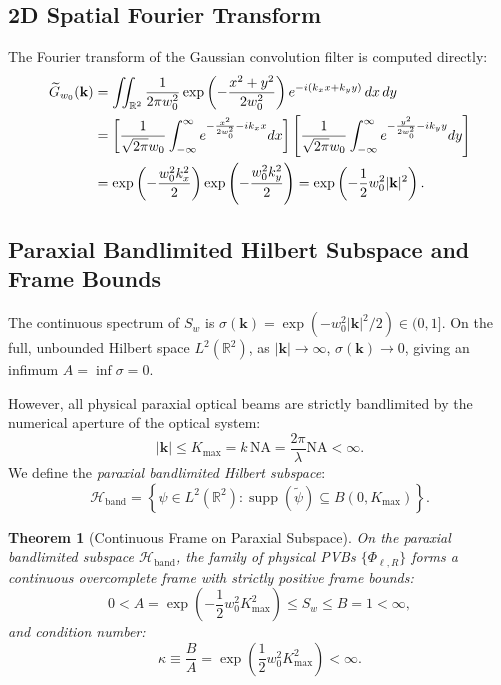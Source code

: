 \documentclass{optica-article}
\newtheorem{theorem}{Theorem}
\begin{document}
\subsection{2D Spatial Fourier Transform}

The Fourier transform of the Gaussian convolution filter is computed directly:
\begin{align}
\widetilde{G}_{w_0}(\mathbf{k}) &= \iint_{\mathbb{R}^2} \frac{1}{2\pi w_0^2} \exp\left( - \frac{x^2 + y^2}{2 w_0^2} \right) e^{-i(k_x x + k_y y)} \, dx \, dy \notag \\
&= \left[ \frac{1}{\sqrt{2\pi} w_0} \int_{-\infty}^\infty e^{-\frac{x^2}{2 w_0^2} - i k_x x} dx \right] \left[ \frac{1}{\sqrt{2\pi} w_0} \int_{-\infty}^\infty e^{-\frac{y^2}{2 w_0^2} - i k_y y} dy \right] \notag \\
&= \exp\left( - \frac{w_0^2 k_x^2}{2} \right) \exp\left( - \frac{w_0^2 k_y^2}{2} \right) = \exp\left( - \frac{1}{2} w_0^2 |\mathbf{k}|^2 \right).
\label{eq:fourier_kernel}
\end{align}

\subsection{Paraxial Bandlimited Hilbert Subspace and Frame Bounds}

The continuous spectrum of $S_w$ is $\sigma(\mathbf{k}) = \exp(-w_0^2 |\mathbf{k}|^2 / 2) \in (0, 1]$. On the full, unbounded Hilbert space $L^2(\mathbb{R}^2)$, as $|\mathbf{k}| \to \infty$, $\sigma(\mathbf{k}) \to 0$, giving an infimum $A = \inf \sigma = 0$.

However, all physical paraxial optical beams are strictly bandlimited by the numerical aperture of the optical system:
\begin{equation}
|\mathbf{k}| \le K_{\max} = k \, \text{NA} = \frac{2\pi}{\lambda} \text{NA} < \infty.
\label{eq:kmax_na}
\end{equation}
We define the \emph{paraxial bandlimited Hilbert subspace}:
\begin{equation}
\mathcal{H}_{\text{band}} = \left\{ \psi \in L^2(\mathbb{R}^2) : \operatorname{supp}(\widetilde{\psi}) \subseteq B(0, K_{\max}) \right\}.
\label{eq:h_band_def}
\end{equation}

\begin{theorem}[Continuous Frame on Paraxial Subspace]
\label{thm:frame_bounds}
On the paraxial bandlimited subspace $\mathcal{H}_{\text{band}}$, the family of physical PVBs $\{\Phi_{\ell, R}\}$ forms a continuous overcomplete frame with strictly positive frame bounds:
\begin{equation}
\boxed{0 < A = \exp\left( - \frac{1}{2} w_0^2 K_{\max}^2 \right) \le S_w \le B = 1 < \infty,}
\label{eq:thm3_frame_bounds}
\end{equation}
and condition number:
\begin{equation}
\kappa \equiv \frac{B}{A} = \exp\left( \frac{1}{2} w_0^2 K_{\max}^2 \right) < \infty.
\label{eq:thm3_condition_number}
\end{equation}
\end{theorem}
\end{document}
